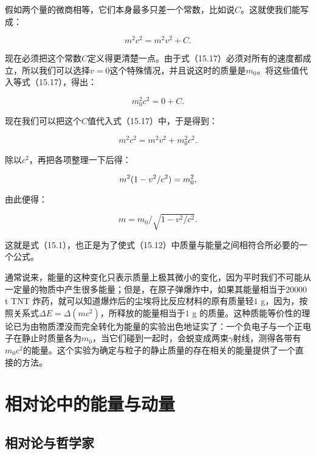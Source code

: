 \documentclass[12pt,oneside]{book}
\begin{document}
假如两个量的微商相等，它们本身最多只差一个常数，比如说$C$。这就使我们能写成：


\begin{equation}
\label{Eq:I:15:17}
m^2c^2=m^2v^2+C.
\end{equation}

现在必须把这个常数$C$定义得更清楚一点。由于式（15.17）必须对所有的速度都成立，所以我们可以选择$v = 0$这个特殊情况，并且说这时的质量是$m_0$。将这些值代入等式（15.17），得出：


\begin{equation*}
m_0^2c^2=0+C.
\end{equation*}

现在我们可以把这个$C$值代入式（15.17）中，于是得到：

\begin{equation}
\label{Eq:I:15:18}
m^2c^2=m^2v^2+m_0^2c^2.
\end{equation}

除以$c^2$，再把各项整理一下后得：


\begin{equation}
m^2(1-v^2/c^2)=m_0^2,\notag
\end{equation}


由此便得：

\begin{equation}
\label{Eq:I:15:19}
m=m_0/\sqrt{1-v^2/c^2}.
\end{equation}

这就是式（15.1），也正是为了使式（15.12）中质量与能量之间相符合所必要的一个公式。


通常说来，能量的这种变化只表示质量上极其微小的变化，因为平时我们不可能从一定量的物质中产生很多能量；但是，在原子弹爆炸中，如果其能量相当于$20000$ t TNT 炸药，就可以知道爆炸后的尘埃将比反应材料的原有质量轻$1$ g，因为，按照关系式$\Delta E = \Delta (mc^2)$，所释放的能量相当于$1$ g 的质量。这种质能等价性的理论已为由物质湮没而完全转化为能量的实验出色地证实了：一个负电子与一个正电子在静止时质量各为$m_0$，当它们碰到一起时，会蜕变成两束$\gamma$射线，测得各带有$m_0 c^2$的能量。这个实验为确定与粒子的静止质量的存在相关的能量提供了一个直接的方法。


\chapter{相对论中的能量与动量}
\section{相对论与哲学家}
\end{document}
